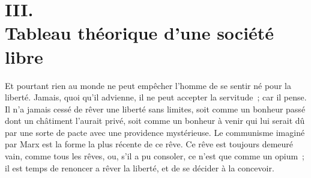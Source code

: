 \documentclass[french,twoside]{book} %
\begin{document}
\begin{center}
\end{center}
\section[III. Tableau théorique d’une société libre]{III. \\
Tableau théorique d’une société libre}\renewcommand{\leftmark}{III. \\
Tableau théorique d’une société libre}

\noindent \par
Et pourtant rien au monde ne peut empêcher l'homme de se sentir né pour la liberté. Jamais, quoi qu'il advienne, il ne peut accepter la servitude ; car il pense. Il n'a jamais cessé de rêver une liberté sans limites, soit comme un bonheur passé dont un châtiment l'aurait privé, soit comme un bonheur à venir qui lui serait dû par une sorte de pacte avec une providence mystérieuse. Le communisme imaginé par Marx est la forme la plus récente de ce rêve. Ce rêve est toujours demeuré vain, comme tous les rêves, ou, s'il a pu consoler, ce n'est que comme un opium ; il est temps de renoncer a rêver la liberté, et de se décider à la concevoir.\par
\end{document}
